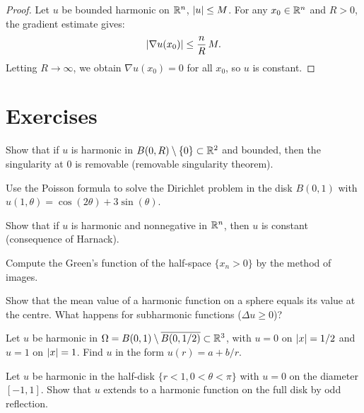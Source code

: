 \begin{proof}
Let $u$ be bounded harmonic on $\mathbb{R}^n$, $\left| u \right| \leq M$. For any
$x_0 \in \mathbb{R}^n$ and $R > 0$, the gradient estimate gives:
\[
    \left| \nabla u(x_0) \right| \leq \frac{n}{R}\, M.
\]
Letting $R \to \infty$, we obtain $\nabla u(x_0) = 0$ for all $x_0$,
so $u$ is constant.
\end{proof}

\section{Exercises}

\begin{exercise}
Show that if $u$ is harmonic in $B(0,R) \setminus \{0\} \subset \mathbb{R}^2$
and bounded, then the singularity at $0$ is removable (removable
singularity theorem).
\end{exercise}

\begin{exercise}
Use the Poisson formula to solve the Dirichlet problem in the disk
$B(0,1)$ with $u(1,\theta) = \cos(2\theta) + 3\sin(\theta)$.
\end{exercise}

\begin{exercise}
Show that if $u$ is harmonic and nonnegative in $\mathbb{R}^n$, then $u$ is
constant (consequence of Harnack).
\end{exercise}

\begin{exercise}
Compute the Green's function of the half-space $\{x_n > 0\}$ by the
method of images.
\end{exercise}

\begin{exercise}
Show that the mean value of a harmonic function on a sphere equals its
value at the centre. What happens for subharmonic functions
($\Delta u \geq 0$)?
\end{exercise}

\begin{exercise}
Let $u$ be harmonic in $\Omega = B(0,1) \setminus \overline{B(0,1/2)}
\subset \mathbb{R}^3$, with $u = 0$ on $\left| x \right| = 1/2$ and $u = 1$ on $\left| x \right| = 1$.
Find $u$ in the form $u(r) = a + b/r$.
\end{exercise}

\begin{exercise}
Let $u$ be harmonic in the half-disk $\{r < 1, 0 < \theta < \pi\}$
with $u = 0$ on the diameter $[-1,1]$. Show that $u$ extends to a
harmonic function on the full disk by odd reflection.
\end{exercise}
